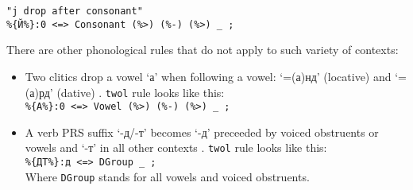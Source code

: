 \begin{code_frame}[float]
    \begin{footnotesize}\codespacing
    \begin{verbatim}
"j drop after consonant"
%{Й%}:0 <=> Consonant (%>) (%-) (%>) _ ;
    \end{verbatim}
    \end{footnotesize}
    \tcblower
    \label{code:5_2}
\end{code_frame}


There are other phonological rules that do not apply to such variety of contexts:
\begin{itemize}
    \item Two clitics drop a vowel `а' when following a vowel: `=(а)нд' (locative) and `=(а)рд' (dative) . \texttt{twol} rule looks like this:\\
    \texttt{\%\{А\%\}:0 <=> Vowel (\%>) (\%-) (\%>) \_ ;}
    \item A verb PRS suffix `-д/-т' becomes `-д' preceeded by voiced obstruents or vowels and `-т' in all other contexts \parencite[262]{parker_shughni_2023}. \texttt{twol} rule looks like this:\\
    \texttt{\%\{ДТ\%\}:д <=> DGroup \_ ;}\\
    Where \texttt{DGroup} stands for all vowels and voiced obstruents.
\end{itemize}


